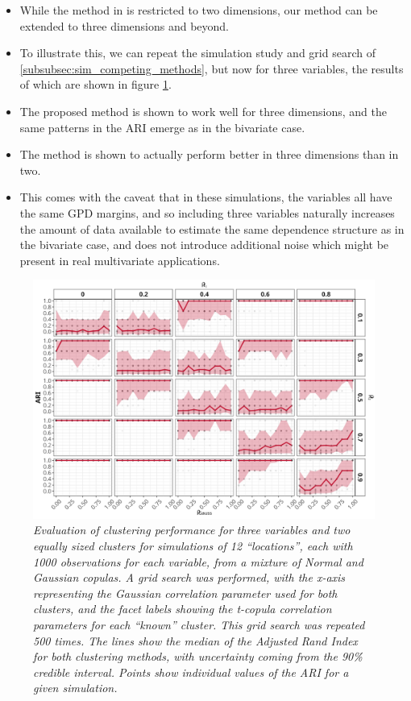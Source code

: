\documentclass{article}
\numberwithin{equation}{section}
\begin{document}
\begin{itemize}
  \item While the method in \cite{Vignotto2021} is restricted to two dimensions, our method can be extended to three dimensions and beyond.
  \item To illustrate this, we can repeat the simulation study and grid search of \ref{subsubsec:sim_competing_methods}, but now for three variables, the results of which are shown in figure \ref{fig:02_3d}.
  \item The proposed method is shown to work well for three dimensions, and the same patterns in the ARI emerge as in the bivariate case.
  \item The method is shown to actually perform better in three dimensions than in two.
  \item This comes with the caveat that in these simulations, the variables all have the same GPD margins, and so including three variables naturally increases the amount of data available to estimate the same dependence structure as in the bivariate case, and does not introduce additional noise which might be present in real multivariate applications.
\end{itemize}

\begin{figure}[H]
    \centering
    \includegraphics[width = 0.9\linewidth]{plots/sim_01c_js_sens_3_var_dqu_0.9.png}
    \caption{\emph{Evaluation of clustering performance for three variables and two equally sized clusters for simulations of 12 ``locations'', each with 1000 observations for each variable, from a mixture of Normal and Gaussian copulas. A grid search was performed,  with the x-axis representing the Gaussian correlation parameter used for both clusters, and the facet labels showing the t-copula correlation parameters for each ``known'' cluster. This grid search was repeated 500 times. The lines show the median of the Adjusted Rand Index for both clustering methods, with uncertainty coming from the 90\% credible interval. Points show individual values of the ARI for a given simulation.}} 
    \label{fig:02_3d}
\end{figure}
\end{document}

